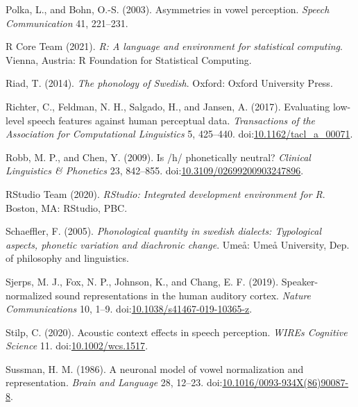 \documentclass[utf8]{frontiersSCNS}
\newlength{\cslhangindent}
\newlength{\cslentryspacingunit} %
\newenvironment{CSLReferences}[2] %
 {%
  \setlength{\parindent}{0pt}
  \ifodd #1
  \let\oldpar\par
  \def\par{\hangindent=\cslhangindent\oldpar}
  \fi
  \setlength{\parskip}{#2\cslentryspacingunit}
 }%
 {}
\begin{document}
\begin{CSLReferences}{1}{0}
\leavevmode{}%
Polka, L., and Bohn, O.-S. (2003). Asymmetries in vowel perception. \emph{Speech Communication} 41, 221--231.

\leavevmode{}%
R Core Team (2021). \emph{R: {A} language and environment for statistical computing}. {Vienna, Austria}: {R Foundation for Statistical Computing}.

\leavevmode{}%
Riad, T. (2014). \emph{The phonology of {Swedish}}. {Oxford}: {Oxford University Press}.

\leavevmode{}%
Richter, C., Feldman, N. H., Salgado, H., and Jansen, A. (2017). Evaluating low-level speech features against human perceptual data. \emph{Transactions of the Association for Computational Linguistics} 5, 425--440. doi:\href{https://doi.org/10.1162/tacl_a_00071}{10.1162/tacl\_a\_00071}.

\leavevmode{}%
Robb, M. P., and Chen, Y. (2009). Is /h/ phonetically neutral? \emph{Clinical Linguistics \& Phonetics} 23, 842--855. doi:\href{https://doi.org/10.3109/02699200903247896}{10.3109/02699200903247896}.

\leavevmode{}%
RStudio Team (2020). \emph{{RStudio}: {Integrated} development environment for {R}}. {Boston, MA}: {RStudio, PBC.}

\leavevmode{}%
Schaeffler, F. (2005). \emph{Phonological quantity in swedish dialects: Typological aspects, phonetic variation and diachronic change}. {Umeå}: {Umeå University, Dep. of philosophy and linguistics}.

\leavevmode{}%
Sjerps, M. J., Fox, N. P., Johnson, K., and Chang, E. F. (2019). Speaker-normalized sound representations in the human auditory cortex. \emph{Nature Communications} 10, 1--9. doi:\href{https://doi.org/10.1038/s41467-019-10365-z}{10.1038/s41467-019-10365-z}.

\leavevmode{}%
Stilp, C. (2020). Acoustic context effects in speech perception. \emph{WIREs Cognitive Science} 11. doi:\href{https://doi.org/10.1002/wcs.1517}{10.1002/wcs.1517}.

\leavevmode{}%
Sussman, H. M. (1986). A neuronal model of vowel normalization and representation. \emph{Brain and Language} 28, 12--23. doi:\href{https://doi.org/10.1016/0093-934X(86)90087-8}{10.1016/0093-934X(86)90087-8}.


\end{CSLReferences}
\end{document}
